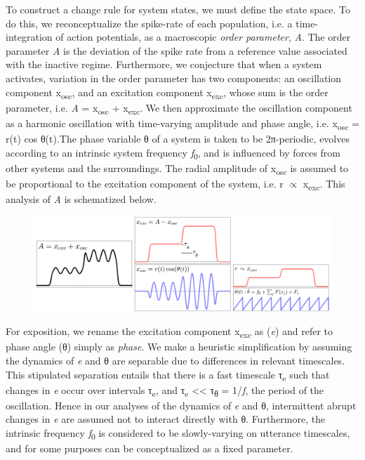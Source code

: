 To construct a change rule for system states, we must define the state space. To do this, we reconceptualize the spike-rate of each population, i.e. a time-integration of action potentials, as a macroscopic \textit{order parameter}, \textit{A}. The order parameter \textit{A} is the deviation of the spike rate from a reference value associated with the inactive regime. Furthermore, we conjecture that when a system activates, variation in the order parameter has two components: an oscillation component x\textsubscript{osc}, and an excitation component x\textsubscript{exc}, whose sum is the order parameter, i.e. \textit{A} = x\textsubscript{osc} + x\textsubscript{exc}. We then approximate the oscillation component as a harmonic oscillation with time-varying amplitude and phase angle, i.e. x\textsubscript{osc} = r(t) cos θ(t).The phase variable θ of a system is taken to be 2π{}-periodic, evolves according to an intrinsic system frequency \textit{f}\textsubscript{0}, and is influenced by forces from other systems and the surroundings. The radial amplitude of x\textsubscript{osc} is assumed to be proportional to the excitation component of the system, i.e. r  ${\propto}$ x\textsubscript{exc}. This analysis of \textit{A} is schematized below.  

  
\begin{figure}
\includegraphics[width=\textwidth]{figures/Tilsen-img12.png}
\caption{\missingcaption}
\label{fig:2:5}
\end{figure}
 

  For exposition, we rename the excitation component x\textsubscript{exc} as (\textit{e}) and refer to phase angle (θ) simply as \textit{phase}. We make a heuristic simplification by assuming the dynamics of \textit{e} and θ are separable due to differences in relevant timescales. This stipulated separation entails that there is a fast timescale τ\textsubscript{e} such that changes in \textit{e} occur over intervals τ\textsubscript{e}, and τ\textsubscript{e} << τ\textsubscript{θ} = 1/\textit{f}, the period of the oscillation. Hence in our analyses of the dynamics of \textit{e} and θ, intermittent abrupt changes in \textit{e} are assumed not to interact directly with θ. Furthermore, the intrinsic frequency \textit{f}\textsubscript{0} is considered to be slowly-varying on utterance timescales, and for some purposes can be conceptualized as a fixed parameter. 

